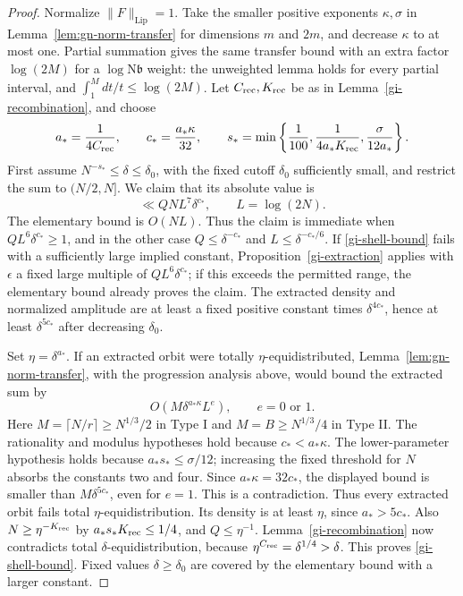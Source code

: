 \documentclass[11pt]{article}
\theoremstyle{definition}
\theoremstyle{remark}
\begin{document}
\begin{proof}
Normalize $\|F\|_{\mathrm{Lip}}=1$.  Take the smaller positive exponents
$\kappa,\sigma$ in Lemma~\ref{lem:gn-norm-transfer} for dimensions $m$
and $2m$, and decrease $\kappa$ to at most one.  Partial summation gives
the same transfer bound with an extra factor $\log(2M)$ for a
$\log\mathrm N\mathfrak b$ weight: the unweighted lemma holds for
every partial interval, and $\int_1^Mdt/t\leq\log(2M)$.
Let $C_{\rm rec},K_{\rm rec}$ be as in Lemma~\ref{gi-recombination},
and choose
\begin{equation}\label{gi-exponent-choice}
 a_*=\frac1{4C_{\rm rec}},\qquad
 c_* =\frac{a_*\kappa}{32},\qquad
 s_* =\min\left\{\frac1{100},\frac1{4a_*K_{\rm rec}},
                             \frac{\sigma}{12a_*}\right\}.
\end{equation}
First assume $N^{-s_*}\leq\delta\leq\delta_0$, with the fixed cutoff
$\delta_0$ sufficiently small, and restrict the sum to $(N/2,N]$.
We claim that its absolute value is
\begin{equation}\label{gi-shell-bound}
                  \ll QNL^7\delta^{c_*},\qquad L=\log(2N).
\end{equation}
The elementary bound is $O(NL)$.  Thus the claim is immediate when
$QL^6\delta^{c_*}\geq1$, and in the other case
$Q\leq\delta^{-c_*}$ and $L\leq\delta^{-c_*/6}$.
If \eqref{gi-shell-bound} fails with a sufficiently large implied
constant, Proposition~\ref{gi-extraction} applies with
$\epsilon$ a fixed large multiple of $QL^6\delta^{c_*}$; if this
exceeds the permitted range, the elementary bound already proves the
claim.  The extracted density and normalized amplitude are at least
a fixed positive constant times $\delta^{4c_*}$, hence at least
$\delta^{5c_*}$ after decreasing $\delta_0$.

Set $\eta=\delta^{a_*}$.  If an extracted orbit were totally
$\eta$-equidistributed, Lemma~\ref{lem:gn-norm-transfer}, with the
progression analysis above, would bound the extracted sum by
\[
 O(M\delta^{a_*\kappa}L^e),\qquad e=0\text{ or }1.
\]
Here $M=\lceil N/r\rceil\geq N^{1/3}/2$ in Type I and
$M=B\geq N^{1/3}/4$ in Type II.  The rationality and modulus hypotheses
hold because $c_*<a_*\kappa$.  The lower-parameter hypothesis holds
because $a_*s_*\leq\sigma/12$; increasing the fixed threshold for $N$
absorbs the constants two and four.  Since $a_*\kappa=32c_*$, the
displayed bound is smaller than $M\delta^{5c_*}$, even for $e=1$.
This is a contradiction.  Thus every extracted orbit fails total
$\eta$-equidistribution.  Its density is at least $\eta$, since
$a_*>5c_*$.  Also $N\geq\eta^{-K_{\rm rec}}$ by
$a_*s_*K_{\rm rec}\leq1/4$, and $Q\leq\eta^{-1}$.
Lemma~\ref{gi-recombination} now contradicts total
$\delta$-equidistribution, because
$\eta^{C_{\rm rec}}=\delta^{1/4}>\delta$.  This proves
\eqref{gi-shell-bound}.  Fixed values $\delta\geq\delta_0$ are covered
by the elementary bound with a larger constant.


\end{proof}
\end{document}
